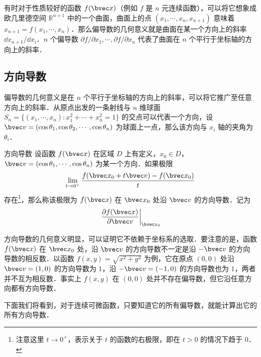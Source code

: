 有时对于性质较好的函数 $f(\bvec x)$（例如 $f$ 是 $n$ 元连续函数），可以将它想象成欧几里德空间 $\mathbb{R}^{n+1}$ 中的一个曲面，曲面上的点 $(x_1,\cdots,x_n,x_{n+1})$ 意味着 $x_{n+1}=f(x_1,\cdots,x_n)$．那么偏导数的几何意义就是曲面在某一个方向上的斜率 $\dd x_{n+1}/\dd x_i$．$n$ 个偏导数 $\partial f/\partial x_1,\cdots,\partial f/\partial x_n$ 代表了曲面在 $n$ 个平行于坐标轴的方向上的斜率．

\subsection{方向导数}
偏导数的几何意义是在 $n$ 个平行于坐标轴的方向上的斜率，可以将它推广至任意方向上的斜率．从原点出发的一条射线与 $n$ 维球面 $S_n=\{(x_1,\cdots,x_n):x_1^2+\cdots+x_n^2=1\}$ 的交点可以代表一个方向，设 $\bvec v=(\cos \theta_1,\cos\theta_2,\cdots,\cos\theta_n)$ 为球面上一点，那么该方向与 $x_i$ 轴的夹角为 $\theta_i$．
\begin{definition}{方向导数}
设函数 $f(\bvec x)$ 在区域 $D$ 上有定义，$x_0\in D$，$\bvec v=(\cos \theta_1,\cdots,\cos\theta_n)$ 为某一个方向．如果极限
\begin{equation}
\lim\limits_{t\rightarrow 0^+}\frac{f(\bvec x_0+t\bvec v)-f(\bvec x_0)}{t}
\end{equation}
存在\footnote{注意这里 $t\rightarrow 0^+$，表示关于 $t$ 的函数的右极限，即在 $t>0$ 的情况下趋于 $0$．}，那么称该极限为 $f(\bvec x)$ 在 $\bvec x_0$ 处沿 $\bvec v$ 的方向导数．记为
\begin{equation}
\left.\frac{\partial f(\bvec x)}{\partial \bvec v}\right|_{\bvec x_0}
\end{equation}
\end{definition}

方向导数的几何意义明显，可以证明它不依赖于坐标系的选取．要注意的是，函数 $f(\bvec x)$ 在 $\bvec x_0$ 处，沿 $\bvec v$ 的方向导数不一定是沿 $-\bvec v$ 的方向导数的相反数．以函数 $f(x,y)=\sqrt{x^2+y^2}$ 为例，它在原点 $(0,0)$ 处沿 $\bvec v=(1,0)$ 的方向导数为 $1$，沿 $-\bvec v=(-1,0)$ 的方向导数也为 $1$，两者并不互为相反数．事实上 $f(x,y)$ 在 $(0,0)$ 处并不存在偏导数，但它沿任意方向都有方向导数．

下面我们将看到，对于连续可微函数，只要知道它的所有偏导数，就能计算出它的所有方向导数．
